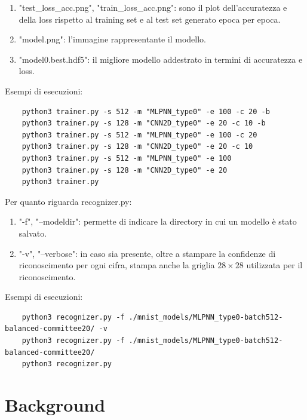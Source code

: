 \documentclass[12pt]{article}
\begin{document}
\begin{enumerate}
    \item "test\_loss\_acc.png", "train\_loss\_acc.png": sono il plot dell'accuratezza e della loss
    rispetto al training set e al test set generato epoca per epoca.
    \item "model.png": l'immagine rappresentante il modello.
    \item "model0.best.hdf5": il migliore modello addestrato in termini di accuratezza e loss.
\end{enumerate}

Esempi di esecuzioni:

\begin{lstlisting}
    python3 trainer.py -s 512 -m "MLPNN_type0" -e 100 -c 20 -b
    python3 trainer.py -s 128 -m "CNN2D_type0" -e 20 -c 10 -b
    python3 trainer.py -s 512 -m "MLPNN_type0" -e 100 -c 20
    python3 trainer.py -s 128 -m "CNN2D_type0" -e 20 -c 10
    python3 trainer.py -s 512 -m "MLPNN_type0" -e 100
    python3 trainer.py -s 128 -m "CNN2D_type0" -e 20
    python3 trainer.py
\end{lstlisting}

Per quanto riguarda recognizer.py:

\begin{enumerate}
    \item "-f", "--modeldir": permette di indicare la directory in cui un modello
    è stato salvato.
    \item "-v", "--verbose": in caso sia presente, oltre a stampare la confidenze
    di riconoscimento per ogni cifra, stampa anche la griglia $28\times28$ utilizzata per il riconoscimento.

\end{enumerate}

Esempi di esecuzioni:

\begin{lstlisting}
    python3 recognizer.py -f ./mnist_models/MLPNN_type0-batch512-balanced-committee20/ -v    
    python3 recognizer.py -f ./mnist_models/MLPNN_type0-batch512-balanced-committee20/    
    python3 recognizer.py    
\end{lstlisting}

\newpage


\section{Background}
\end{document}
